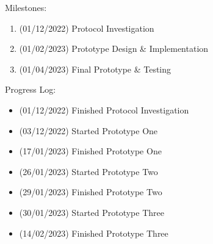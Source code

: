 Milestones:

\begin{enumerate}
	\item (01/12/2022) Protocol Investigation
	\item (01/02/2023) Prototype Design \& Implementation
	\item (01/04/2023) Final Prototype \& Testing
\end{enumerate}

Progress Log:

\begin{itemize}
    \item (01/12/2022) Finished Protocol Investigation
    \item (03/12/2022) Started Prototype One
    \item (17/01/2023) Finished Prototype One
    \item (26/01/2023) Started Prototype Two
    \item (29/01/2023) Finished Prototype Two
    \item (30/01/2023) Started Prototype Three
    \item (14/02/2023) Finished Prototype Three
\end{itemize}
